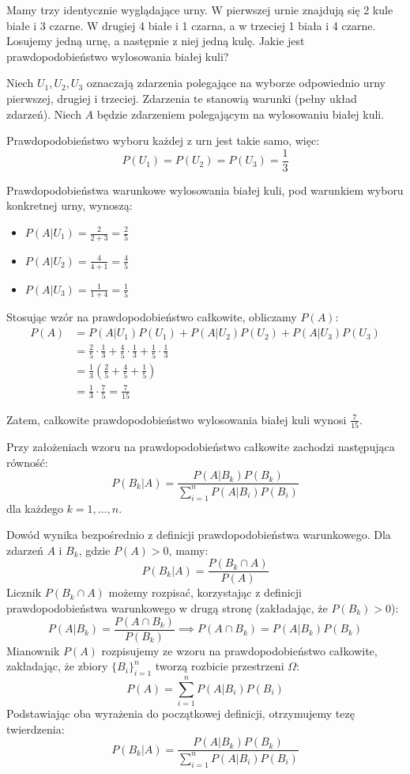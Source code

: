 \documentclass[final,a4paper,openany,12pt]{mwbk}
\begin{document}
\begin{Prz}
Mamy trzy identycznie wyglądające urny. W pierwszej urnie znajdują się 2 kule białe i 3 czarne. W drugiej 4 białe i 1 czarna, a w trzeciej 1 biała i 4 czarne. Losujemy jedną urnę, a następnie z niej jedną kulę. Jakie jest prawdopodobieństwo wylosowania białej kuli?

Niech $U_1, U_2, U_3$ oznaczają zdarzenia polegające na wyborze odpowiednio urny pierwszej, drugiej i trzeciej. Zdarzenia te stanowią warunki (pełny układ zdarzeń). Niech $A$ będzie zdarzeniem polegającym na wylosowaniu białej kuli.

Prawdopodobieństwo wyboru każdej z urn jest takie samo, więc:
\[ P(U_1) = P(U_2) = P(U_3) = \frac{1}{3} \]

Prawdopodobieństwa warunkowe wylosowania białej kuli, pod warunkiem wyboru konkretnej urny, wynoszą:
\begin{itemize}
    \item $P(A|U_1) = \frac{2}{2+3} = \frac{2}{5}$
    \item $P(A|U_2) = \frac{4}{4+1} = \frac{4}{5}$
    \item $P(A|U_3) = \frac{1}{1+4} = \frac{1}{5}$
\end{itemize}

Stosując wzór na prawdopodobieństwo całkowite, obliczamy $P(A)$:
\begin{align*}
P(A) &= P(A|U_1)P(U_1) + P(A|U_2)P(U_2) + P(A|U_3)P(U_3) \\
&= \frac{2}{5} \cdot \frac{1}{3} + \frac{4}{5} \cdot \frac{1}{3} + \frac{1}{5} \cdot \frac{1}{3} \\
&= \frac{1}{3} \left( \frac{2}{5} + \frac{4}{5} + \frac{1}{5} \right) \\
&= \frac{1}{3} \cdot \frac{7}{5} = \frac{7}{15}
\end{align*}

Zatem, całkowite prawdopodobieństwo wylosowania białej kuli wynosi $\frac{7}{15}$.
\end{Prz}

\begin{Tw}
Przy założeniach wzoru na prawdopodobieństwo całkowite zachodzi następująca równość:
\[
P(B_k|A) = \frac{P(A|B_k)P(B_k)}{\sum_{i=1}^{n} P(A|B_i)P(B_i)}
\]
dla każdego $k=1, \dots, n$.
\end{Tw}

\begin{Dow}
 Dowód wynika bezpośrednio z definicji prawdopodobieństwa warunkowego. Dla zdarzeń $A$ i $B_k$, gdzie $P(A) > 0$, mamy:
\[
P(B_k|A) = \frac{P(B_k \cap A)}{P(A)}
\]
Licznik $P(B_k \cap A)$ możemy rozpisać, korzystając z definicji prawdopodobieństwa warunkowego w drugą stronę (zakładając, że $P(B_k) > 0$):
\[
P(A|B_k) = \frac{P(A \cap B_k)}{P(B_k)} \implies P(A \cap B_k) = P(A|B_k)P(B_k)
\]
Mianownik $P(A)$ rozpisujemy ze wzoru na prawdopodobieństwo całkowite, zakładając, że zbiory $\{B_i\}_{i=1}^n$ tworzą rozbicie przestrzeni $\Omega$:
\[
P(A) = \sum_{i=1}^{n} P(A|B_i)P(B_i)
\]
Podstawiając oba wyrażenia do początkowej definicji, otrzymujemy tezę twierdzenia:
\[
P(B_k|A) = \frac{P(A|B_k)P(B_k)}{\sum_{i=1}^{n} P(A|B_i)P(B_i)}
\]   
\end{Dow}
\end{document}
